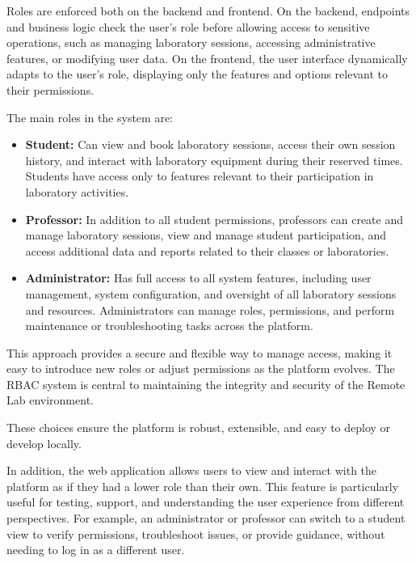 Roles are enforced both on the backend and frontend. On the backend, endpoints and business logic check the user's role before allowing access to sensitive operations, such as managing laboratory sessions, accessing administrative features, or modifying user data. On the frontend, the user interface dynamically adapts to the user's role, displaying only the features and options relevant to their permissions.

The main roles in the system are:
\begin{itemize}
    \item \textbf{Student:} Can view and book laboratory sessions, access their own session history, and interact with laboratory equipment during their reserved times. Students have access only to features relevant to their participation in laboratory activities.
    \item \textbf{Professor:} In addition to all student permissions, professors can create and manage laboratory sessions, view and manage student participation, and access additional data and reports related to their classes or laboratories.
    \item \textbf{Administrator:} Has full access to all system features, including user management, system configuration, and oversight of all laboratory sessions and resources. Administrators can manage roles, permissions, and perform maintenance or troubleshooting tasks across the platform.
\end{itemize}

This approach provides a secure and flexible way to manage access, making it easy to introduce new roles or adjust permissions as the platform evolves. The RBAC system is central to maintaining the integrity and security of the Remote Lab environment.

These choices ensure the platform is robust, extensible, and easy to deploy or develop locally.

In addition, the web application allows users to view and interact with the platform as if they had a lower role than their own. This feature is particularly useful for testing, support, and understanding the user experience from different perspectives. For example, an administrator or professor can switch to a student view to verify permissions, troubleshoot issues, or provide guidance, without needing to log in as a different user. 